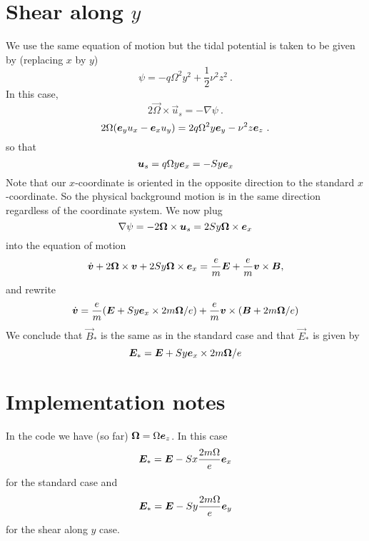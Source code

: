 \documentclass[aps,pre,notitlepage,amsmath,amssymb,amsfonts,nobibnotes,nofootinbib,superscriptaddress,onecolumn,a4paper,10pt]{revtex4-1}
\begin{document}
\section{Shear along $y$}
We use the same equation of motion but the tidal potential is taken to be
given by (replacing $x$ by $y$)
\begin{equation}
  \psi = -q\Omega^2 y^2 + \frac{1}{2}\nu^2 z^2  \ .
\end{equation}
In this case,
\begin{equation}
  2 \vec{\Omega} \times \vec{u}_s = -\nabla \psi
  \ .
\end{equation}
\begin{equation}
  2 \Omega (\bm{e}_y u_x - \bm{e}_x u_y) = 2q\Omega^2 y \bm{e}_y -\nu^2 z \bm{e}_z
  \ .
\end{equation}
so that
\begin{equation}
\bm{u}_s = q \Omega y \bm{e}_x = -Sy\bm{e}_x
\end{equation}
Note that our $x$-coordinate is oriented in the opposite direction to the
standard $x$-coordinate. So the physical background motion is in the same
direction regardless of the coordinate system. We now plug
\begin{equation}
\nabla \psi = - 2 \bm{\Omega} \times \bm{u}_s
= 2Sy\bm{\Omega} \times \bm{e}_x
\end{equation}
into the equation of motion
\begin{equation}
  \dot{\bm{v}} + 2\bm{\Omega}\times\bm{v} + 2Sy\bm{\Omega} \times \bm{e}_x =
  \frac{e}{m}\bm{E} + \frac{e}{m}\bm{v}\times\bm{B},
\end{equation}
and rewrite
\begin{equation}
  \dot{\vec{v}} =
  \frac{e}{m}\left(\vec{E} + Sy \ex \times 2m\vec{\Omega}/e\right) +
  \frac{e}{m}\vec{v}\times \left( \vec{B} + 2m\vec{\Omega}/e \right)
\end{equation}
We conclude that $\vec{B}_\ast$ is the same as in the standard case and that
$\vec{E}_\ast$ is given by
\begin{equation}
  \bm{E}_\ast = \bm{E} + Sy \bm{e}_x \times 2m\bm{\Omega}/e
\end{equation}

\section{Implementation notes}
In the code we have (so far) $\bm{\Omega} = \Omega \bm{e}_z$. In this case
\begin{equation}
  \bm{E}_\ast = \bm{E} - Sx \frac{2m\Omega}{e} \bm{e}_x
\end{equation}
for the standard case and
\begin{equation}
  \bm{E}_\ast = \bm{E} - Sy \frac{2m\Omega}{e} \bm{e}_y
\end{equation}
for the shear along $y$ case.
\end{document}
